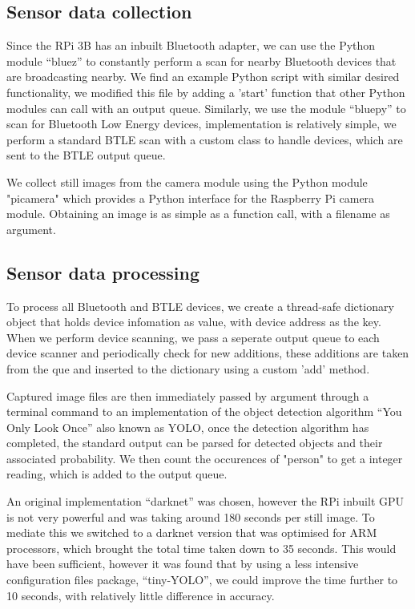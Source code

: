 \documentclass{l4proj}
\begin{document}
\subsection{Sensor data collection}
Since the RPi 3B has an inbuilt Bluetooth adapter, we can use the Python module “bluez” to constantly perform a scan for nearby Bluetooth devices that are broadcasting nearby\cite{c-bluez}. We find an example Python script with similar desired functionality, we modified this file by adding a 'start' function that other Python modules can call with an output queue. Similarly, we use the module “bluepy” to scan for Bluetooth Low Energy devices\cite{c-bluepy}, implementation is relatively simple, we perform a standard BTLE scan with a custom class to handle devices, which are sent to the BTLE output queue. 

We collect still images from the camera module using the Python module "picamera" which provides a Python interface for the Raspberry Pi camera module\cite{c-pypicamera}. Obtaining an image is as simple as a function call, with a filename as argument.


\subsection{Sensor data processing}
To process all Bluetooth and BTLE devices, we create a thread-safe dictionary object that holds device infomation as value, with device address as the key. When we perform device scanning, we pass a seperate output queue to each device scanner and periodically check for new additions, these additions are taken from the que and inserted to the dictionary using a custom 'add' method.

Captured image files are then immediately passed by argument through a terminal command to an implementation of the object detection algorithm “You Only Look Once” also known as YOLO\cite{c-yolo}, once the detection algorithm has completed, the standard output can be parsed for detected objects and their associated probability. We then count the occurences of "person" to get a integer reading, which is added to the output queue.

An original implementation “darknet” was chosen\cite{c-darknet}, however the RPi inbuilt GPU is not very powerful and was taking around 180 seconds per still image. To mediate this we switched to a darknet version that was optimised for ARM processors, which brought the total time taken down to 35 seconds\cite{c-darknetnn}. This would have been sufficient, however it was found that by using a less intensive configuration files package,  “tiny-YOLO”, we could improve the time further to 10 seconds, with relatively little difference in accuracy.
\end{document}
